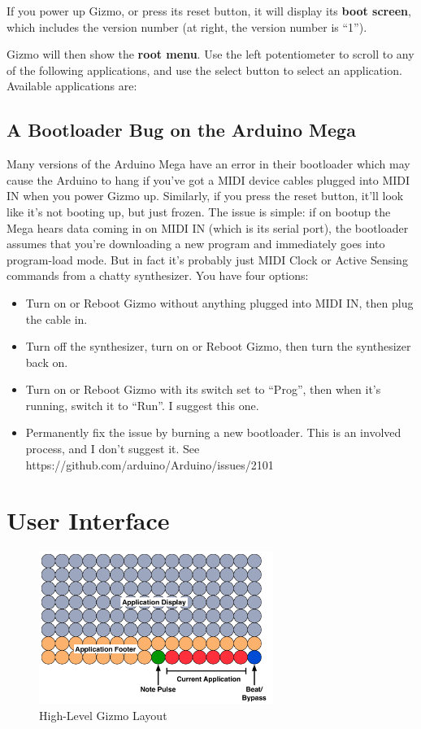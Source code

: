 \documentclass{article}
\begin{document}
If you power up Gizmo, or press its reset button, it will display its {\bf boot screen}, which includes the version number (at right, the version number is ``1'').

Gizmo will then show the {\bf root menu}.  Use the left potentiometer to scroll to any of the following applications, and use the select button to select an application.  Available applications are:

\subsection{A Bootloader Bug on the Arduino Mega}

Many versions of the Arduino Mega have an error in their bootloader which may cause the Arduino to hang if you've got a MIDI device cables plugged into MIDI IN when you power Gizmo up.  Similarly, if you press the reset button, it'll look like it's not booting up, but just frozen.  The issue is simple: if on bootup the Mega hears data coming in on MIDI IN (which is its serial port), the bootloader assumes that you're downloading a new program and immediately goes into program-load mode.    But in fact it's probably just MIDI Clock or Active Sensing commands from a chatty synthesizer.  You have four options:

\begin{itemize}
\item Turn on or Reboot Gizmo without anything plugged into MIDI IN, then plug the cable in.
\item Turn off the synthesizer, turn on or Reboot Gizmo, then turn the synthesizer back on.
\item Turn on or Reboot Gizmo with its switch set to ``Prog'', then when it's running, switch it to ``Run''.  I suggest this one.
\item Permanently fix the issue by burning a new bootloader.  This is an involved process, and I don't suggest it.  See https:/\!/github.com/arduino/Arduino/issues/2101
\end{itemize}


\clearpage

\section{User Interface}

\begin{figure}
\vspace{-1.5em}\includegraphics[width=3in]{OverallLayout.pdf}
\vspace{-2em}\caption{\small High-Level Gizmo Layout}
\label{HighLevelGizmoLayout}
\end{figure}
\end{document}
